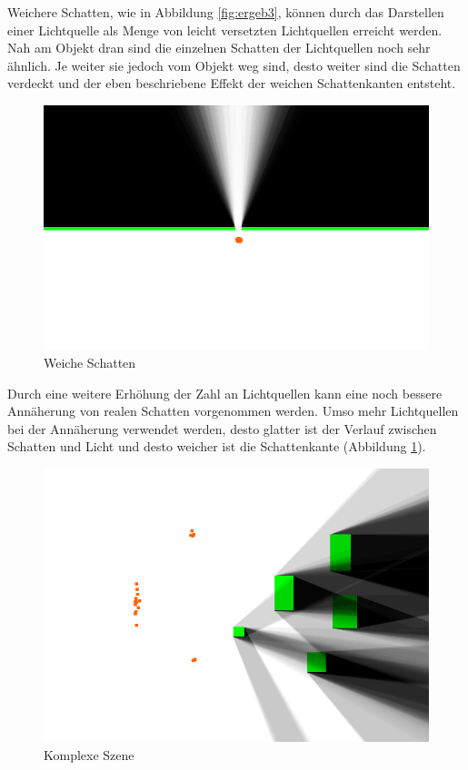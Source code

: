 Weichere Schatten, wie in Abbildung \ref{fig:ergeb3}, können durch das Darstellen einer Lichtquelle
als Menge von leicht versetzten Lichtquellen erreicht werden. Nah am Objekt dran sind die einzelnen Schatten der Lichtquellen noch sehr ähnlich. Je weiter sie jedoch vom Objekt weg sind, desto weiter sind die Schatten verdeckt und der eben beschriebene Effekt der weichen Schattenkanten entsteht.

\begin{figure}[t]
	\centering
	\includegraphics[width=\columnwidth]{images/ergebnis.png}
	\caption{Weiche Schatten}
	\label{fig:ergeb2}
\end{figure}

Durch eine weitere Erhöhung der Zahl an Lichtquellen kann eine noch bessere Annäherung von realen Schatten vorgenommen werden. Umso mehr Lichtquellen bei der Annäherung verwendet werden, desto glatter ist der Verlauf zwischen Schatten und Licht und desto weicher ist die Schattenkante (Abbildung \ref{fig:ergeb2}).

\begin{figure}[t]
	\centering
	\includegraphics[width=\columnwidth]{images/ergebnis_4.png}
	\caption{Komplexe Szene}
	\label{fig:ergeb1}
\end{figure}

